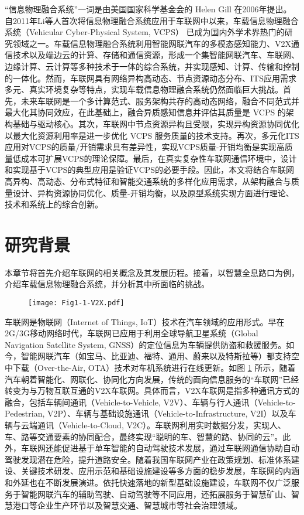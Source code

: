 “信息物理融合系统”一词是由美国国家科学基金会的 Helen Gill 在2006年提出\cite{lee2016introduction}。自2011年Li等人\cite{li2011human}首次将信息物理融合系统应用于车联网中以来，车载信息物理融合系统（Vehicular Cyber-Physical System, VCPS）\cite{xia2019zi} 已成为国内外学术界热门的研究领域之一。车载信息物理融合系统利用智能网联汽车的多模态感知能力、V2X通信技术以及端边云的计算、存储和通信资源，形成一个集智能网联汽车、车联网、边缘计算、云计算等多种技术于一体的综合系统，并实现感知、计算、传输和控制的一体化。然而，车联网具有网络异构高动态、节点资源动态分布、ITS应用需求多元、真实环境复杂等特点，实现车载信息物理融合系统仍然面临巨大挑战。首先，未来车联网是一个多计算范式、服务架构共存的高动态网络，融合不同范式并最大化其协同效应，在此基础上，融合异质感知信息并评估其质量是 VCPS 的架构基础与驱动核心。其次，车联网中节点资源异构且受限，实现异构资源协同优化以最大化资源利用率是进一步优化 VCPS 服务质量的技术支持。再次，多元化ITS应用对VCPS的质量/开销需求具有差异性，实现VCPS质量-开销均衡是实现高质量低成本可扩展VCPS的理论保障。最后，在真实复杂性车联网通信环境中，设计和实现基于VCPS的典型应用是验证VCPS的必要手段。因此，本文将结合车联网高异构、高动态、分布式特征和智能交通系统的多样化应用需求，从架构融合与质量设计、异构资源协同优化、质量-开销均衡，以及原型系统实现方面进行理论、技术和系统上的综合创新。

\section{研究背景}\label{section 1-2}

本章节将首先介绍车联网的相关概念及其发展历程。接着，以智慧全息路口为例，介绍车载信息物理融合系统，并分析其中所面临的挑战。

\begin{figure}[h]
	\centering
\texttt{[image: Fig1-1-V2X.pdf]}
	\label{fig 1-1}
\end{figure}

车联网是物联网（Internet of Things, IoT）技术在汽车领域的应用形式。早在2G/3G移动网络时代，车联网已应用于利用全球导航卫星系统（Global Navigation Satellite System, GNSS）的定位信息为车辆提供防盗和救援服务。如今，智能网联汽车（如宝马、比亚迪、福特、通用、蔚来以及特斯拉等）都支持空中下载（Over-the-Air, OTA）技术对车机系统进行在线更新。如图 \ref{fig 1-1} 所示，随着汽车朝着智能化、网联化、协同化方向发展，传统的面向信息服务的“车联网”已经转变为与万物互联互通的V2X车联网。具体而言，V2X车联网是指多种通讯方式的融合，包括车辆间通讯（Vehicle-to-Vehicle, V2V）、车辆与行人通讯（Vehicle-to-Pedestrian, V2P）、车辆与基础设施通讯（Vehicle-to-Infrastructure, V2I）以及车辆与云端通讯（Vehicle-to-Cloud, V2C）。车联网利用实时数据分发，实现人、车、路等交通要素的协同配合，最终实现“聪明的车、智慧的路、协同的云”。此外，车联网还能促进基于单车智能的自动驾驶技术发展，通过车联网通信协助自动驾驶发现潜在危险，提升道路安全。随着我国车联网产业在政策规划、标准体系建设、关键技术研发、应用示范和基础设施建设等多方面的稳步发展，车联网的内涵和外延也在不断发展演进。依托快速落地的新型基础设施建设，车联网不仅广泛服务于智能网联汽车的辅助驾驶、自动驾驶等不同应用，还拓展服务于智慧矿山、智慧港口等企业生产环节以及智慧交通、智慧城市等社会治理领域\cite{zhong2021che}。

